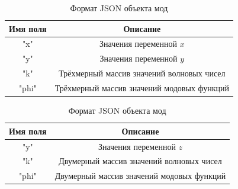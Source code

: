 \documentclass{fefu}
\begin{document}
                \begin{table}[p]
                    \centering
                    \begin{subtable}{\linewidth}
                        \centering
                        \begin{tabular}{|c|c|}
                            \hline
                            Имя поля & Описание\\
                            \hline
                            \textsf{"x"} & Значения переменной $x$\\
                            \hline
                            \textsf{"y"} & Значения переменной $y$\\
                            \hline
                            \textsf{"k"} & Трёхмерный массив значений волновых чисел\\
                            \hline
                            \textsf{"phi"} & Трёхмерный массив значений модовых функций\\
                            \hline
                        \end{tabular}
                    \end{subtable}
                    \begin{subtable}{\linewidth}
                        \centering
                        \begin{tabular}{|c|c|}
                            \hline
                            Имя поля & Описание\\
                            \hline
                            \textsf{"y"} & Значения переменной $z$\\
                            \hline
                            \textsf{"k"} & Двумерный массив значений волновых чисел\\
                            \hline
                            \textsf{"phi"} & Двумерный массив значений модовых функций\\
                            \hline
                        \end{tabular}
                    \end{subtable}
                    \caption{\label{tbl::JSON_mod}Формат JSON объекта мод}
                \end{table}
\end{document}
